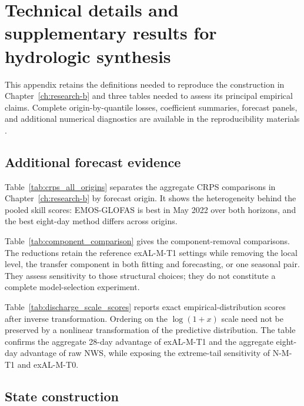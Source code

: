 \chapter{Technical details and supplementary results for hydrologic synthesis}
\label{app:hydrology-technical}

This appendix retains the definitions needed to reproduce the construction in
Chapter~\ref{ch:research-b} and three tables needed to assess its principal
empirical claims. Complete origin-by-quantile losses, coefficient summaries,
forecast panels, and additional numerical diagnostics are available in the
reproducibility materials \citep{env-deleon2026sanlorenzo_reproducibility}.

\section{Additional forecast evidence}
\label{env:app:additional-results}

Table~\ref{tab:crps_all_origins} separates the aggregate CRPS comparisons in
Chapter~\ref{ch:research-b} by forecast origin. It shows the heterogeneity
behind the pooled skill scores: EMOS-GLOFAS is best in May 2022 over both
horizons, and the best eight-day method differs across origins.



Table~\ref{tab:component_comparison} gives the component-removal comparisons.
The reductions retain the reference exAL-M-T1 settings while removing the
local level, the transfer component in both fitting and forecasting, or one
seasonal pair. They assess sensitivity to those structural choices; they do
not constitute a complete model-selection experiment.



Table~\ref{tab:discharge_scale_scores} reports exact empirical-distribution
scores after inverse transformation. Ordering on the $\log(1+x)$ scale need
not be preserved by a nonlinear transformation of the predictive distribution.
The table confirms the aggregate 28-day advantage
of exAL-M-T1 and the aggregate eight-day advantage of raw NWS, while exposing
the extreme-tail sensitivity of N-M-T1 and exAL-M-T0.

\begingroup
\footnotesize

\endgroup

\section{State construction}

